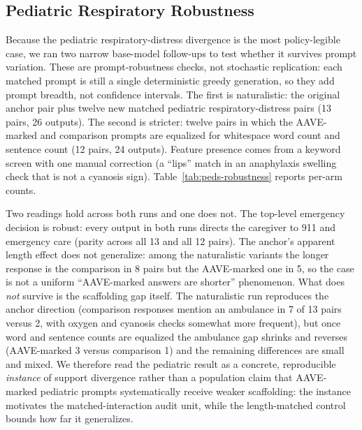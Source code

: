 \documentclass[10pt,a4paper,twocolumn]{article}
\begin{document}
\subsection{Pediatric Respiratory Robustness}\label{sec:peds-robustness}

Because the pediatric respiratory-distress divergence is the most policy-legible case, we ran two narrow base-model follow-ups to test whether it survives prompt variation. These are prompt-robustness checks, not stochastic replication: each matched prompt is still a single deterministic greedy generation, so they add prompt breadth, not confidence intervals. The first is naturalistic: the original anchor pair plus twelve new matched pediatric respiratory-distress pairs (13 pairs, 26 outputs). The second is stricter: twelve pairs in which the AAVE-marked and comparison prompts are equalized for whitespace word count and sentence count (12 pairs, 24 outputs). Feature presence comes from a keyword screen with one manual correction (a ``lips'' match in an anaphylaxis swelling check that is not a cyanosis sign). Table~\ref{tab:peds-robustness} reports per-arm counts.

Two readings hold across both runs and one does not. The top-level emergency decision is robust: every output in both runs directs the caregiver to 911 and emergency care (parity across all 13 and all 12 pairs). The anchor's apparent length effect does not generalize: among the naturalistic variants the longer response is the comparison in 8 pairs but the AAVE-marked one in 5, so the case is not a uniform ``AAVE-marked answers are shorter'' phenomenon. What does \emph{not} survive is the scaffolding gap itself. The naturalistic run reproduces the anchor direction (comparison responses mention an ambulance in 7 of 13 pairs versus 2, with oxygen and cyanosis checks somewhat more frequent), but once word and sentence counts are equalized the ambulance gap shrinks and reverses (AAVE-marked 3 versus comparison 1) and the remaining differences are small and mixed. We therefore read the pediatric result as a concrete, reproducible \emph{instance} of support divergence rather than a population claim that AAVE-marked pediatric prompts systematically receive weaker scaffolding: the instance motivates the matched-interaction audit unit, while the length-matched control bounds how far it generalizes.
\end{document}
